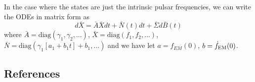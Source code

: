 \documentclass[fleqn,usenatbib,useAMS]{mnras}
\begin{document}
In the case where the states are just the intrinsic pulsar frequencies, we can write the ODEs in matrix form as
\begin{equation}
	d\bar{X} = \bar{A} \bar{X} dt + \bar{N}(t) dt + \bar{\Sigma} d\bar{B}(t) 
\end{equation}
where $\bar{A} = \text{diag}(\gamma_1, \gamma_2,...)$,  $\bar{X} = \text{diag}(f_1, f_2,...)$, $\bar{N} =\text{diag}(\gamma_1[a_1+b_1t] + b_1, ...)$
and we have let $a = f_{EM}(0)$, $b = \dot{f}_{\rm EM}(0)$.


\subsection{References}
\label{sec:ref_list}













\bsp	%
\label{lastpage}
\end{document}
